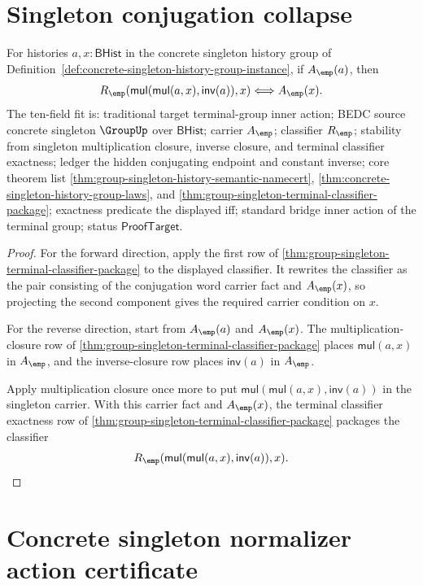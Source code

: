 \section{Singleton conjugation collapse}
\label{sec:group-singleton-conjugation-collapse}

\begin{theorem}
\label{thm:group-singleton-conjugation-fixed-carrier}
For histories $a,x:\mathsf{BHist}$ in the concrete singleton history group of
Definition~\ref{def:concrete-singleton-history-group-instance}, if
$A_{\emp}(a)$, then
$$
R_{\emp}(\mathsf{mul}(\mathsf{mul}(a,x),\mathsf{inv}(a)),x)
\Longleftrightarrow A_{\emp}(x).
$$
The ten-field fit is: traditional target terminal-group inner action; BEDC
source concrete singleton $\GroupUp$ over $\mathsf{BHist}$; carrier
$A_{\emp}$; classifier $R_{\emp}$; stability from singleton multiplication
closure, inverse closure, and terminal classifier exactness; ledger the hidden
conjugating endpoint and constant inverse; core theorem list
\autoref{thm:group-singleton-history-semantic-namecert},
\autoref{thm:concrete-singleton-history-group-laws}, and
\autoref{thm:group-singleton-terminal-classifier-package}; exactness predicate
the displayed iff; standard bridge inner action of the terminal group; status
$\mathsf{ProofTarget}$.
\end{theorem}
\begin{proof}
For the forward direction, apply the first row of
\autoref{thm:group-singleton-terminal-classifier-package} to the displayed
classifier. It rewrites the classifier as the pair consisting of the conjugation
word carrier fact and $A_{\emp}(x)$, so projecting the second component gives
the required carrier condition on $x$.

For the reverse direction, start from $A_{\emp}(a)$ and $A_{\emp}(x)$. The
multiplication-closure row of
\autoref{thm:group-singleton-terminal-classifier-package} places
$\mathsf{mul}(a,x)$ in $A_{\emp}$, and the inverse-closure row places
$\mathsf{inv}(a)$ in $A_{\emp}$.

Apply multiplication closure once more to put
$\mathsf{mul}(\mathsf{mul}(a,x),\mathsf{inv}(a))$ in the singleton carrier.
With this carrier fact and $A_{\emp}(x)$, the terminal classifier exactness row
of \autoref{thm:group-singleton-terminal-classifier-package} packages the
classifier
$$
R_{\emp}(\mathsf{mul}(\mathsf{mul}(a,x),\mathsf{inv}(a)),x).
$$
\end{proof}

\section{Concrete singleton normalizer action certificate}
\label{sec:group-singleton-normalizer-action-certificate}

